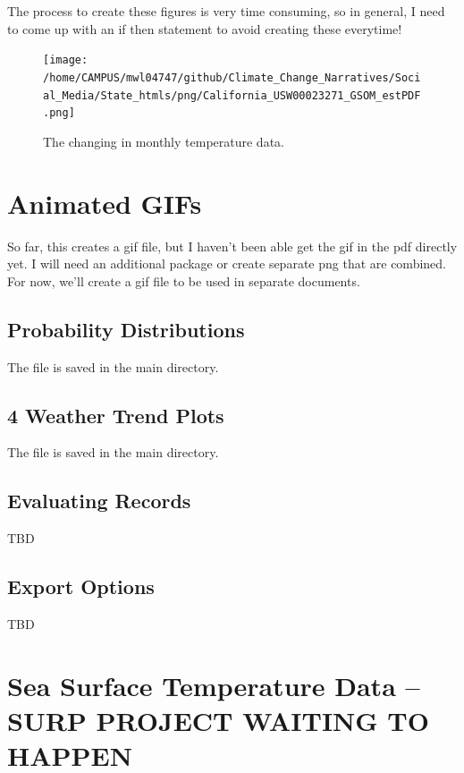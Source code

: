 \documentclass{article}\usepackage[]{graphicx}\usepackage[]{color}
\begin{document}
The process to create these figures is very time consuming, so in general, I need to come up with an if then statement to avoid creating these everytime!

\begin{figure}
\texttt{[image: /home/CAMPUS/mwl04747/github/Climate\_Change\_Narratives/Social\_Media/State\_htmls/png/California\_USW00023271\_GSOM\_estPDF.png]}
\caption{The changing in monthly temperature data.}
\label{fig:GSOM_estPDF}
\end{figure}

\section{Animated GIFs}

So far, this creates a gif file, but I haven't been able get the gif in the pdf directly yet. I will need an additional package or create separate png that are combined. For now, we'll create a gif file to be used in separate documents.

\subsection{Probability Distributions}




The file is saved in the main directory. 


\subsection{4 Weather Trend Plots}




The file is saved in the main directory. 


\subsection{Evaluating Records}

TBD

\subsection{Export Options}

TBD

\section{Sea Surface Temperature Data -- SURP PROJECT WAITING TO HAPPEN}
\end{document}
